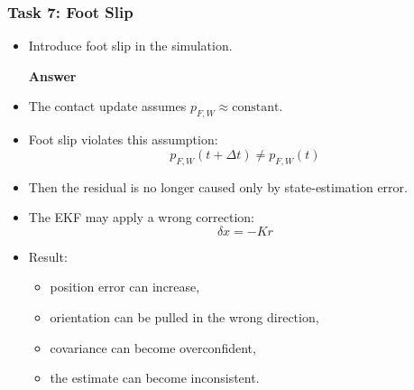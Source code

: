\documentclass[aspectratio=169]{beamer}
\begin{document}
\begin{frame}
	\frametitle{Task 7: Foot Slip}
	
	\begin{itemize}
		\item Introduce foot slip in the simulation.
		
		\pause
		\textbf{Answer}
		\item The contact update assumes $p_{F,W} \approx \text{constant}$.		
		\item Foot slip violates this assumption:
		\[
		p_{F,W}(t + \Delta t) \neq p_{F,W}(t)
		\]
		
		\item Then the residual is no longer caused only by state-estimation error.
		\item The EKF may apply a wrong correction:
		\[
		\delta x = -Kr
		\]		
		\item Result:
		\begin{itemize}
			\item position error can increase,
			\item orientation can be pulled in the wrong direction,
			\item covariance can become overconfident,
			\item the estimate can become inconsistent.
		\end{itemize}
	\end{itemize}
	
\end{frame}
\end{document}
